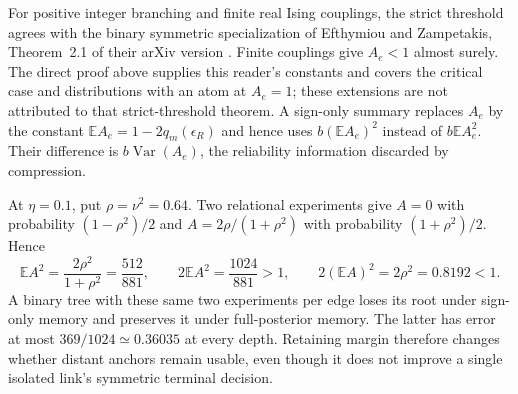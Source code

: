 \documentclass[11pt,a4paper]{article}
\newcommand{\E}{\mathbb E}
\begin{document}
For positive integer branching and finite real Ising couplings, the strict threshold agrees with the binary symmetric specialization of Efthymiou and Zampetakis, Theorem~2.1 of their arXiv version \cite{EfthymiouZampetakis2023}. Finite couplings give $A_e<1$ almost surely. The direct proof above supplies this reader's constants and covers the critical case and distributions with an atom at $A_e=1$; these extensions are not attributed to that strict-threshold theorem. A sign-only summary replaces $A_e$ by the constant $\E A_e=1-2q_m(\epsilon_R)$ and hence uses $b(\E A_e)^2$ instead of $b\E A_e^2$. Their difference is $b\operatorname{Var}(A_e)$, the reliability information discarded by compression.

At $\eta=0.1$, put $\rho=\nu^2=0.64$. Two relational experiments give $A=0$ with probability $(1-\rho^2)/2$ and $A=2\rho/(1+\rho^2)$ with probability $(1+\rho^2)/2$. Hence
\[
 \E A^2=\frac{2\rho^2}{1+\rho^2}=\frac{512}{881},\qquad
 2\E A^2=\frac{1024}{881}>1,\qquad
 2(\E A)^2=2\rho^2=0.8192<1.
\]
A binary tree with these same two experiments per edge loses its root under sign-only memory and preserves it under full-posterior memory. The latter has error at most $369/1024\simeq0.36035$ at every depth. Retaining margin therefore changes whether distant anchors remain usable, even though it does not improve a single isolated link's symmetric terminal decision.
\end{document}
